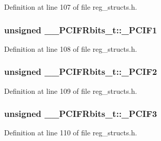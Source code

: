 Definition at line 107 of file reg\+\_\+structs.\+h.

\hypertarget{union_____p_c_i_f_rbits__t_ac659378a43767f64110245c2547fa45b}{
\subsubsection[{\+\_\+\+P\+C\+I\+F1}]{\setlength{\rightskip}{0pt plus 5cm}unsigned \+\_\+\+\_\+\+P\+C\+I\+F\+Rbits\+\_\+t\+::\+\_\+\+P\+C\+I\+F1}}\label{union_____p_c_i_f_rbits__t_ac659378a43767f64110245c2547fa45b}


Definition at line 108 of file reg\+\_\+structs.\+h.

\hypertarget{union_____p_c_i_f_rbits__t_a111baf04c2d4110cb5ca2da302bf069d}{
\subsubsection[{\+\_\+\+P\+C\+I\+F2}]{\setlength{\rightskip}{0pt plus 5cm}unsigned \+\_\+\+\_\+\+P\+C\+I\+F\+Rbits\+\_\+t\+::\+\_\+\+P\+C\+I\+F2}}\label{union_____p_c_i_f_rbits__t_a111baf04c2d4110cb5ca2da302bf069d}


Definition at line 109 of file reg\+\_\+structs.\+h.

\hypertarget{union_____p_c_i_f_rbits__t_a84fa3f46398331838d5541d1ef7daa3d}{
\subsubsection[{\+\_\+\+P\+C\+I\+F3}]{\setlength{\rightskip}{0pt plus 5cm}unsigned \+\_\+\+\_\+\+P\+C\+I\+F\+Rbits\+\_\+t\+::\+\_\+\+P\+C\+I\+F3}}\label{union_____p_c_i_f_rbits__t_a84fa3f46398331838d5541d1ef7daa3d}


Definition at line 110 of file reg\+\_\+structs.\+h.

